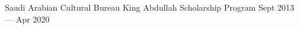 

\begin{cventries}

  \cventrynodesc
    {Saudi Arabian Cultural Bureau} %
    {King Abdullah Scholarship Program} %
    {} %
    {Sept 2013 — Apr 2020} %

\end{cventries}
